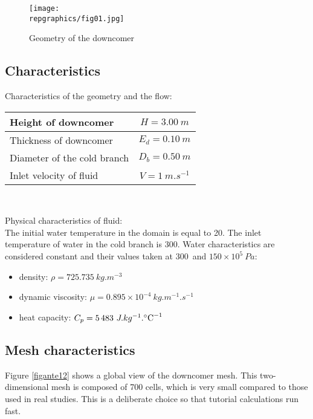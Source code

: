 \begin{figure}[h!]
\begin{center}
\texttt{[image: \\repgraphics/fig01.jpg]} 
\caption{Geometry of the downcomer}
\label{figante11}
\end{center}
\end{figure}

	\subsection{Characteristics}

Characteristics of the geometry and the flow:
\begin{center}
\begin{tabular}{|l|c|}
\hline
Height of downcomer & $H = 3.00\ m$ \\
\hline
Thickness of downcomer & $E_{d} = 0.10\ m$ \\
\hline
Diameter of the cold branch & $D_{b} = 0.50\ m$ \\
\hline
Inlet velocity of fluid & $V = 1\ m.s^{-1}$ \\
\hline
\end{tabular}\\
\end{center}

Physical characteristics of fluid:\\
The initial water temperature in the domain is equal to 20\degresC.
The inlet temperature of water in the cold branch is 300\degresC.
Water characteristics are considered constant and their values taken at
300\degresC\ and $150\times 10^{5}\ Pa$: 
\begin{itemize}
	\item density: $\rho = 725.735\ kg.m^{-3}$ 
	\item dynamic viscosity: $\mu = 0.895\times10^{-4}\ kg.m^{-1}.s^{-1}$
	\item heat capacity: $C_{p} = 5\,483\ J.kg^{-1}.\mbox{\degresC}^{-1}$ 
\end{itemize}


	\subsection{Mesh characteristics}

Figure \ref{figante12} shows a global view of the downcomer mesh. This
two-dimensional mesh is composed 
of 700 cells, which is very small compared to those used in real
studies. This is  
a deliberate choice so that tutorial calculations run fast.


